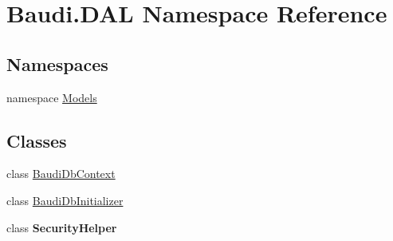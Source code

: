 \hypertarget{namespace_baudi_1_1_d_a_l}{}\section{Baudi.\+D\+A\+L Namespace Reference}
\label{namespace_baudi_1_1_d_a_l}
\subsection*{Namespaces}
\begin{DoxyCompactItemize}
\item 
namespace \hyperlink{namespace_baudi_1_1_d_a_l_1_1_models}{Models}
\end{DoxyCompactItemize}
\subsection*{Classes}
\begin{DoxyCompactItemize}
\item 
class \hyperlink{class_baudi_1_1_d_a_l_1_1_baudi_db_context}{Baudi\+Db\+Context}
\item 
class \hyperlink{class_baudi_1_1_d_a_l_1_1_baudi_db_initializer}{Baudi\+Db\+Initializer}
\item 
class {\bfseries Security\+Helper}
\end{DoxyCompactItemize}
